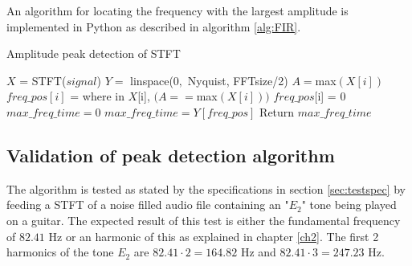 An algorithm for locating the frequency with the largest amplitude is implemented in Python as described in algorithm \ref{alg:FIR}.
\begin{algorithm}[H]
\caption{Amplitude peak detection of STFT}
\label{alg:FIR}
\begin{algorithmic}[1] 
\State  $X$ = STFT($signal$) 
\State $Y =$ linspace($0,$ Nyquist, FFTsize/2) 
		\State $A = $max$(X[i])$ 
		 
			\State $freq\_pos[i]$ = where in $X$[i], $(A == $max$(X[i]))$ 
		\Else
			\State $freq\_pos$[i] = 0	
		\EndIf
			\State $max\_freq\_time = 0$
		\Else
			\State $max\_freq\_time = Y[freq\_pos]$
		\EndIf
	\EndFor
	\State Return $max\_freq\_time$
\EndProcedure
\end{algorithmic}
\end{algorithm}

\subsection{Validation of peak detection algorithm}
The algorithm is tested as stated by the specifications in section \ref{sec:testspec} by feeding a STFT of a noise filled audio file containing an "$E_2$" tone being played on a guitar. 
The expected result of this test is either the fundamental frequency of $82.41$ Hz or an harmonic of this as explained in chapter \ref{ch2}. The first 2 harmonics of the tone $E_2$ are $82.41 \cdot 2 = 164.82$ Hz and $82.41 \cdot 3 = 247.23$ Hz.

